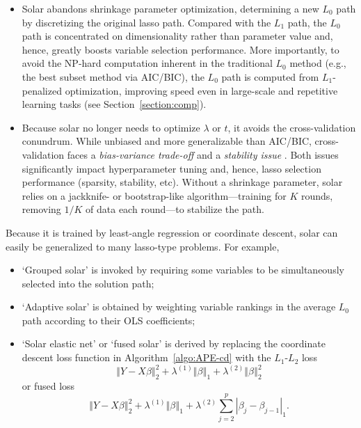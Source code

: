 \documentclass[11pt,authoryear]{elsarticle}
\begin{document}
\begin{itemize}

  \item Solar abandons shrinkage parameter optimization, determining a new $L_0$ path by discretizing the original lasso path. Compared with the $L_1$ path, the $L_0$ path is concentrated on dimensionality rather than parameter value and, hence, greatly boosts variable selection performance. More importantly, to avoid the NP-hard computation inherent in the traditional $L_0$ method (e.g., the best subset method via AIC/BIC), the $L_0$ path is computed from $L_1$-penalized optimization, improving speed even in large-scale and repetitive learning tasks (see Section~\ref{section:comp}).

  \item Because solar no longer needs to optimize $\lambda$ or $t$, it avoids the cross-validation conundrum. While unbiased and more generalizable than AIC/BIC, cross-validation faces a \emph{bias-variance trade-off} \citep{kearns1999algorithmic} and a \emph{stability issue} \citep{lim2016estimation}. Both issues significantly impact hyperparameter tuning and, hence, lasso selection performance (sparsity, stability, etc). Without a shrinkage parameter, solar relies on a jackknife- or bootstrap-like algorithm---training for $K$ rounds, removing $1/K$ of data each round---to stabilize the path.

\end{itemize}

Because it is trained by least-angle regression or coordinate descent, solar can easily be generalized to many lasso-type problems. For example,

\begin{itemize}
  \item `Grouped solar' is invoked by requiring some variables to be simultaneously selected into the solution path;
  \item `Adaptive solar' is obtained by weighting variable rankings in the average $L_0$ path according to their OLS coefficients;
  \item `Solar elastic net' or `fused solar' is derived by replacing the coordinate descent loss function in Algorithm~\ref{algo:APE-cd} with the $L_1$-$L_2$ loss
    \begin{equation}
      \left\Vert Y -X\beta \right\Vert_2^2 + \lambda^{(1)} \left\Vert \beta \right\Vert_1 + \lambda^{(2)} \left\Vert \beta \right\Vert_2^2
    \end{equation}
    or fused loss
    \begin{equation}
      \left\Vert Y -X\beta \right\Vert_2^2 + \lambda^{(1)} \left\Vert \beta \right\Vert_1 + \lambda^{(2)} \sum_{j=2}^{p} \left\vert \beta_j - \beta_{j-1} \right\vert_1.
    \end{equation}
\end{itemize}
\end{document}
